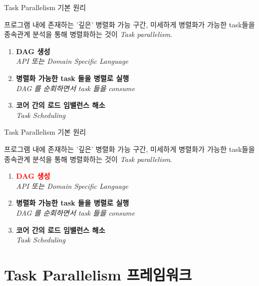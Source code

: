 \documentclass{bredelebeamer}
\begin{document}
\begin{frame}[fragile]{Task Parallelism 기본 원리}
  \begin{center}
  프로그램 내에 존재하는 '깊은' 병렬화 가능 구간, 미세하게 병렬화가 가능한 task들을 종속관계 분석을 통해 병렬화하는 것이 \textit{Task parallelism}.
  \end{center}

  \begin{enumerate}
    \item \textbf{DAG 생성} \\
      \textit{API 또는 Domain Specific Language}
    \item \textbf{병렬화 가능한 task 들을 병렬로 실행} \\
      \textit{DAG 를 순회하면서 task 들을 consume} 
    \item \textbf{코어 간의 로드 임밸런스 해소} \\
      \textit{Task Scheduling}
  \end{enumerate}
\end{frame}

\begin{frame}[fragile]{Task Parallelism 기본 원리}
  \begin{center}
  프로그램 내에 존재하는 '깊은' 병렬화 가능 구간, 미세하게 병렬화가 가능한 task들을 종속관계 분석을 통해 병렬화하는 것이 \textit{Task parallelism}.
  \end{center}

  \begin{enumerate}
    \item \textcolor{red}{\textbf{DAG 생성}} \\
      \textit{API 또는 Domain Specific Language}
    \item \textbf{병렬화 가능한 task 들을 병렬로 실행} \\
      \textit{DAG 를 순회하면서 task 들을 consume} 
    \item \textbf{코어 간의 로드 임밸런스 해소} \\
      \textit{Task Scheduling}
  \end{enumerate}
\end{frame}

\section{Task Parallelism 프레임워크}
\end{document}
